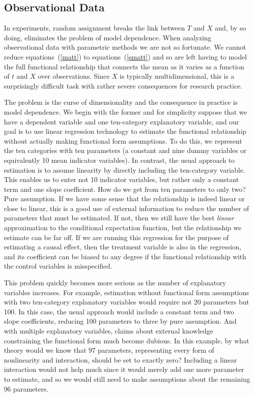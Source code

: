 \documentclass[11pt,titlepage]{article}
\begin{document}
\subsection{Observational Data} \label{s:paraobs}

In experiments, random assignment breaks the link between $T$ and $X$
and, by so doing, eliminates the problem of model dependence.  When
analyzing observational data with parametric methods we are not so
fortunate.  We cannot reduce equations~(\ref{matt}) to
equations~(\ref{smatt}) and so are left having to model the full
functional relationship that connects the mean as it varies as a
function of $t$ and $X$ over observations.  Since $X$ is typically
multidimensional, this is a surprisingly difficult task with rather
severe consequences for research practice.

The problem is the curse of dimensionality and the consequence in
practice is model dependence.  We begin with the former and for
simplicity suppose that we have a dependent variable and one
ten-category explanatory variable, and our goal is to use linear
regression technology to estimate the functional relationship without
actually making functional form assumptions.  To do this, we represent
the ten categories with ten parameters (a constant and nine dummy
variables or equivalently 10 mean indicator variables).  In contrast,
the usual approach to estimation is to assume linearity by directly
including the ten-category variable.  This enables us to enter not 10
indicator variables, but rather only a constant term and one slope
coefficient.  How do we get from ten parameters to only two?  Pure
assumption.  If we have some sense that the relationship is indeed
linear or close to linear, this is a good use of external information
to reduce the number of parameters that must be estimated.  If not,
then we still have the best {\it linear} approximation to the
conditional expectation function, but the relationship we estimate can
be far off.  If we are running this regression for the purpose of
estimating a causal effect, then the treatment variable is also in the
regression, and its coefficient can be biased to any degree if the
functional relationship with the control variables is misspecified.

This problem quickly becomes more serious as the number of explanatory
variables increases.  For example, estimation without functional form
assumptions with two ten-category explanatory variables would require
not 20 parameters but 100.  In this case, the usual approach would
include a constant term and two slope coefficients, reducing 100
parameters to three by pure assumption.  And with multiple explanatory
variables, claims about external knowledge constraining the functional
form much become dubious.  In this example, by what theory would we
know that 97 parameters, representing every form of nonlinearity and
interaction, should be set to exactly zero?  Including a linear
interaction would not help much since it would merely add one more
parameter to estimate, and so we would still need to make assumptions
about the remaining 96 parameters.
\end{document}
